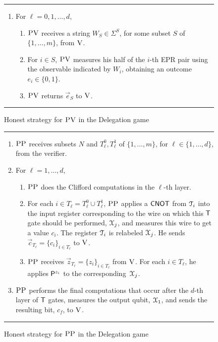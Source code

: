   \begin{figure}[htbp]
\rule{\textwidth}{0.5pt}
\vspace{-1.8em}
\begin{enumerate}
\item For $\ell=0,1,\ldots,d$,
\begin{enumerate}
\item $\textsc{PV}$ receives a string $W_{S} \in\Sigma^{S}$, for some subset $S$ of $\{1,\ldots,m\}$, from $\textsc{V}$. 
\item For $i\in S$, $\textsc{PV}$ measures his half of the $i$-th EPR pair using the observable indicated by $W_i$, obtaining an outcome $e_i\in\{0,1\}$. 
\item $\textsc{PV}$ returns $\vec{e}_S$ to $\textsc{V}$. 
\end{enumerate}
\end{enumerate}
\rule[2ex]{\textwidth}{0.5pt}\vspace{-.5cm}
\caption{Honest strategy for $\textsc{PV}$ in the Delegation game}\label{fig:leash-protocol-PV}
  \end{figure}
  
  \begin{figure}[htbp]
\rule[1ex]{\textwidth}{0.5pt}
\vspace{-1.8em}
\begin{enumerate}
\item $\textsc{PP}$ receives subsets $N$ and $T_\ell^0,T_\ell^1$ of $\{1,\ldots,m\}$, for $\ell\in\{1,\ldots,d\}$, from the verifier. 
\item For $\ell=1,\dots,d$, 
\begin{enumerate}
\item $\textsc{PP}$ does the Clifford computations in the $\ell$-th layer.
 \item For each $i\in T_\ell = T_\ell^0\cup T_\ell^1$, $\textsc{PP}$ applies a $\sf CNOT$ from ${\cal T}_i$ into the input register corresponding to the wire on which this $\sf T$ gate should be performed, ${\cal X}_{j}$, and measures this wire to get a value $c_i$. The register ${\cal T}_i$ is relabeled ${\cal X}_{j}$. He sends $\vec{c}_{T_\ell} = \{c_i\}_{i\in T_{\ell}}$ to $\textsc{V}$.
\item $\textsc{PP}$ receives $\vec{z}_{T_{\ell}}=\{z_i\}_{i\in T_\ell}$ from $\textsc{V}$. For each $i\in T_\ell$, he applies ${\sf P}^{z_i}$ to the corresponding~${\cal X}_{j}$. 
\end{enumerate} 
\item $\textsc{PP}$ performs the final computations that occur after the $d$-th layer of $\sf T$ gates, measures the output qubit, ${\cal X}_1$, and sends the resulting bit, $c_f$, to $\textsc{V}$. 
\end{enumerate}
\rule[2ex]{\textwidth}{0.5pt}\vspace{-.5cm}
\caption{Honest strategy for $\textsc{PP}$  in the Delegation game}\label{fig:leash-protocol-PP}
\end{figure}




